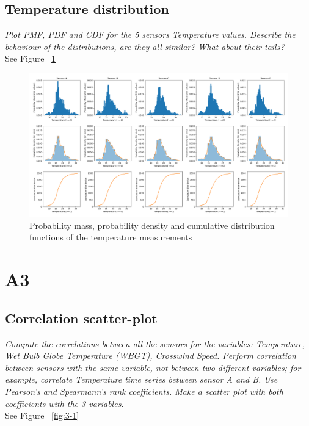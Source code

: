 \documentclass{article}
\begin{document}
\subsection{Temperature distribution}
\textit{
Plot PMF, PDF and CDF for the 5 sensors Temperature values. Describe the behaviour of the distributions, are they all similar?
What about their tails?
}\\

See Figure ~\ref{fig:2-1}

\begin{figure}[!htb]
\centering
\includegraphics[width=\textwidth]{2-1-14_bins.png}
\caption{Probability mass, probability density and cumulative distribution functions of the temperature measurements}
\label{fig:2-1}
\end{figure}

\newpage

\section{A3}

\subsection{Correlation scatter-plot}
\textit{
Compute the correlations between all the sensors for the variables: Temperature, Wet Bulb Globe Temperature (WBGT), Crosswind Speed. Perform correlation between sensors with the same variable, not between two different variables; for example, correlate Temperature time series between sensor A and B. Use Pearson’s and Spearmann’s rank coefficients. Make a scatter plot with both coefficients with the 3 variables.
}\\


See Figure ~\ref{fig:3-1}
\end{document}
